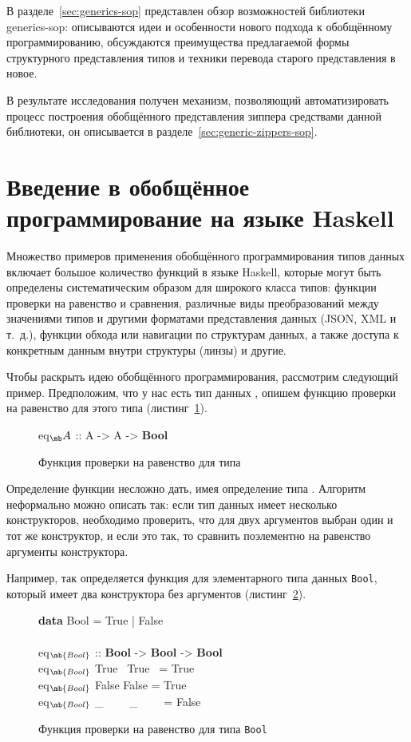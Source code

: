 В разделе~\ref{sec:generics-sop} представлен обзор возможностей
библиотеки \textsf{generics-sop}: описываются идеи и особенности
нового подхода к обобщённому программированию, обсуждаются преимущества предлагаемой формы структурного представления типов и техники перевода старого представления в новое.

В результате исследования получен механизм, позволяющий
автоматизировать процесс построения обобщённого представления
зиппера средствами данной библиотеки, он описывается в
разделе~\ref{sec:generic-zippers-sop}.

\section{Введение в обобщённое программирование на языке Haskell}
\label{sec:generic-prog}

Множество примеров применения обобщённого программирования
типов данных включает большое количество функций в языке Haskell,
которые могут быть определены систематическим образом для
широкого класса типов: функции проверки на равенство и сравнения,
различные виды преобразований между значениями типов и другими
форматами представления данных (JSON, XML и т.~д.), функции
обхода или навигации по структурам данных, а также доступа к
конкретным данным внутри структуры (линзы) и другие.

Чтобы раскрыть идею обобщённого программирования, рассмотрим
следующий пример. Предположим, что у нас есть тип данных
, опишем функцию проверки на равенство для этого типа
(листинг~\ref{list:eq-a}).
\begin{figure}[h]
\begin{framed}
\ttfamily\small
eq$_\mb A$ :: A -> A -> \textbf{Bool}
\end{framed}
\caption{Функция проверки на равенство для типа }
\label{list:eq-a}
\end{figure}

Определение функции  несложно дать, имея
определение типа . Алгоритм неформально можно описать
так: если тип данных имеет несколько конструкторов, необходимо
проверить, что для двух аргументов выбран один и тот же
конструктор, и если это так, то сравнить поэлементно на равенство
аргументы конструктора.

Например, так определяется функция  для
элементарного типа данных \lstinline{Bool}, который имеет два
конструктора без аргументов (листинг~\ref{list:eq-bool}).
\begin{figure}[h]
\begin{framed}
\ttfamily\small
\textbf{data} Bool = True | False\\
\\
eq$_\mb{Bool}$ :: \textbf{Bool} -> \textbf{Bool} -> \textbf{Bool}\\
eq$_\mb{Bool}$ True~ True~ = True\\
eq$_\mb{Bool}$ False False = True\\
eq$_\mb{Bool}$ \_~~~~ \_~~~~ = False
\end{framed}
\caption{Функция проверки на равенство для типа \lstinline{Bool}}
\label{list:eq-bool}
\end{figure}

